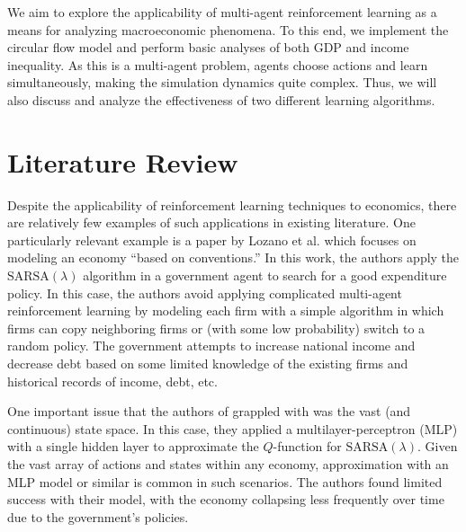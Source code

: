 \documentclass[twoside,twocolumn]{article}
\begin{document}
\medskip 

We aim to explore the applicability of multi-agent reinforcement learning as a means for analyzing macroeconomic phenomena. To this end, we implement the circular flow model and perform basic analyses of both GDP and income inequality. As this is a multi-agent problem, agents choose actions and learn simultaneously, making the simulation dynamics quite complex. Thus, we will also discuss and analyze the effectiveness of two different learning algorithms.


\section{Literature Review}

Despite the applicability of reinforcement learning techniques to economics, there are relatively few examples of such applications in existing literature. One particularly relevant example is a paper by Lozano et al. \cite{RePEc:col:000092:003907} which focuses on modeling an economy ``based on conventions.'' In this work, the authors apply the $\text{SARSA}(\lambda)$ algorithm in a government agent to search for a good expenditure policy. In this case, the authors avoid applying complicated multi-agent reinforcement learning by modeling each firm with a simple algorithm in which firms can copy neighboring firms or (with some low probability) switch to a random policy. The government attempts to increase national income and decrease debt based on some limited knowledge of the existing firms and historical records of income, debt, etc. 

\medskip

One important issue that the authors of \cite{RePEc:col:000092:003907} grappled with was the vast (and continuous) state space. In this case, they applied a multilayer-perceptron (MLP) with a single hidden layer to approximate the $Q$-function for $\text{SARSA}(\lambda)$. Given the vast array of actions and states within any economy, approximation with an MLP model or similar is common in such scenarios. The authors found limited success with their model, with the economy collapsing less frequently over time due to the government's policies.

\medskip
\end{document}
